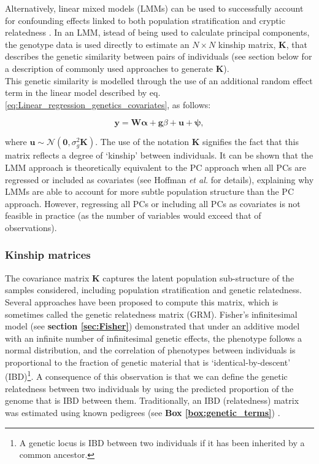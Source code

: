 Alternatively, linear mixed models (LMMs) can be used to successfully account for confounding effects linked to both population stratification and cryptic relatedness 
\cite{yu2006unified, kang2008efficient,kang2010variance, price2010new, zhou2012genome, lee2018genome}.
In an LMM, istead of being used to calculate principal components, the genotype data is used directly to estimate an $N \times N$ kinship matrix, $\mathbf{K}$, that describes the genetic similarity between pairs of individuals (see section below for a description of commonly used approaches to generate $\mathbf{K}$). \\

This genetic similarity is modelled through the use of an additional random effect term in the linear model described by eq. \eqref{eq:Linear_regression_genetics_covariates}, as follows:

\begin{equation}\label{eq:Linear_mixed_model}
 \mathbf{y} =  \mathbf{W}\boldsymbol{\alpha} + \mathbf{g}\beta + \mathbf{u} + \boldsymbol{\psi}, 
\end{equation}

where $\mathbf{u} \sim \mathcal{N}(\mathbf{0}, \sigma_g^2\mathbf{K})$.
The use of the notation $\mathbf{K}$ signifies the fact that this matrix reflects a degree of `kinship' between individuals. 
It can be shown that the LMM approach is theoretically equivalent to the PC approach when all PCs are regressed or included as covariates (see Hoffman \textit{et al.} \cite{hoffman2013correcting} for details), explaining why LMMs are able to account for more subtle population structure than the PC approach. 
However, regressing all PCs or including all PCs as covariates is not feasible in practice (as the number of variables would exceed that of observations). 


\subsubsection{Kinship matrices}
\label{sec:kinship_matrices}

The covariance matrix $\mathbf{K}$ captures the latent population sub-structure of the samples considered, including population stratification and genetic relatedness.
Several approaches have been proposed to compute this matrix, which is sometimes called the genetic relatedness matrix (GRM).
Fisher’s infinitesimal model (see \textbf{section \ref{sec:Fisher}}) \cite{fisher1919xv} demonstrated that under an additive model with an infinite number of infinitesimal genetic effects, the phenotype follows a normal distribution, and the correlation of phenotypes between individuals is proportional to the fraction of genetic material that is `identical-by-descent' (IBD)\footnote{A genetic locus is IBD between two individuals if it has been inherited by a common ancestor.}. 
A consequence of this observation is that we can define the genetic relatedness between two individuals by using the predicted proportion of the genome that is IBD between them. 
Traditionally, an IBD (relatedness) matrix was estimated using known pedigrees (see \textbf{Box \ref{box:genetic_terms}}) \cite{lange1976extensions}. 
\\

